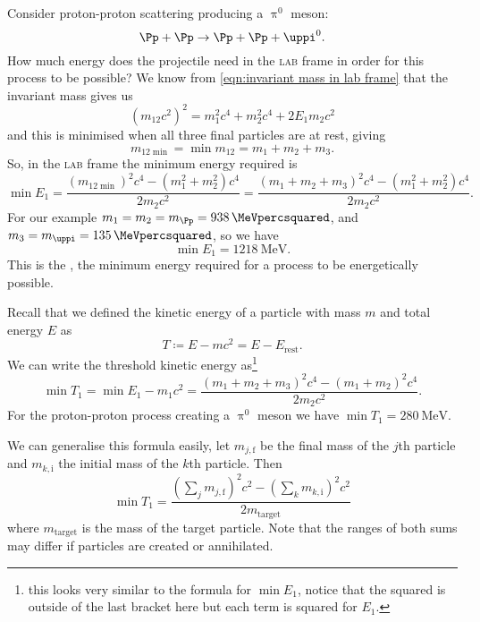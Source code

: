 \documentclass[fleqn]{NotesClass}
\makeatletter
\newcommand{\PBASE@pion}{\ensuremath{\uppi}}
\newcommand{\PBASE@pion}{\ensuremath{\pi}}
\newcommand{\Ppion}{\PBASE@pion}
\newcommand{\Ppionzero}{\ensuremath{\Ppion^0}}
\newcommand{\Ppi}{\Ppion}
\newcommand{\Ppizero}{\Ppionzero}
\newcommand{\LAB}{\textsc{lab}}
\makeatother
\begin{document}
    Consider proton-proton scattering producing a \Ppizero{} meson:
    \begin{equation}
        \Pp + \Pp \to \Pp + \Pp + \Ppizero.
    \end{equation}
    How much energy does the projectile need in the \LAB{} frame in order for this process to be possible?
    We know from \cref{eqn:invariant mass in lab frame} that the invariant mass gives us
    \begin{equation}
        (m_{12}c^2)^2 = m_1^2c^4 + m_2^2c^4 + 2E_1m_2c^2
    \end{equation}
    and this is minimised when all three final particles are at rest, giving
    \begin{equation}
        m_{12\min} = \min m_{12} = m_1 + m_2 + m_3.
    \end{equation}
    So, in the \LAB{} frame the minimum energy required is
    \begin{equation}
        \min E_1 = \frac{(m_{12\min})^2 c^4 - (m_1^2 + m_2^2)c^4}{2m_2c^2} = \frac{(m_1 + m_2 + m_3)^2c^4 - (m_1^2 + m_2^2)c^4}{2m_2c^2}.
    \end{equation}
    For our example \(m_1 = m_2 = m_{\Pp} = \qty{938}{\MeVpercsquared}\), and \(m_3 = m_{\Ppi} = \qty{135}{\MeVpercsquared}\), so we have
    \begin{equation}
        \min E_1 = \qty{1218}{\MeV}.
    \end{equation}
    This is the , the minimum energy required for a process to be energetically possible.
    
    Recall that we defined the kinetic energy of a particle with mass \(m\) and total energy \(E\) as
    \begin{equation}
        T \coloneqq E - mc^2 = E - E_{\mathrm{rest}}.
    \end{equation}
    We can write the threshold kinetic energy as\footnote{this looks very similar to the formula for \(\min E_1\), notice that the squared is outside of the last bracket here but each term is squared for \(E_1\).}
    \begin{equation}
        \min T_1 = \min E_1 - m_1c^2 = \frac{(m_1 + m_2 + m_3)^2c^4 - (m_1 + m_2)^2c^4}{2m_2c^2}.
    \end{equation}
    For the proton-proton process creating a \Ppizero{} meson we have \(\min T_1 = \qty{280}{\MeV}\).
    
    We can generalise this formula easily, let \(m_{j,\mathrm{f}}\) be the final mass of the \(j\)th particle and \(m_{k, \mathrm{i}}\) the initial mass of the \(k\)th particle.
    Then
    \begin{equation}
        \min T_1 = \frac{(\sum_j m_{j,\mathrm{f}})^2c^2 - (\sum_k m_{k,\mathrm{i}})^2c^2}{2m_{\mathrm{target}}}
    \end{equation}
    where \(m_{\mathrm{target}}\) is the mass of the target particle.
    Note that the ranges of both sums may differ if particles are created or annihilated.
    
\end{document}
